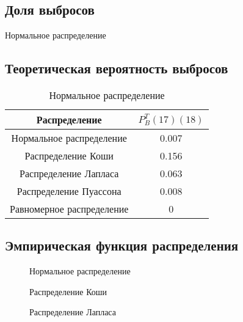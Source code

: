 \subsection{Доля выбросов}
	\begin{table}[H]
		\label{tabular:timesandtenses}
		\begin{center}
			
		\end{center}
		\caption{Нормальное распределение}
	\end{table}

\subsection{Теоретическая вероятность выбросов}
	\begin{table}[H]
		\label{tabular:timesandtenses}
		\begin{center}
			\begin{tabular}{| c | c |} \hline Распределение & $P_B^T (17) (18)$ \\ \hline
				 Нормальное распределение & 0.007 \\ \hline 
				 Распределение Коши & 0.156 \\ \hline 
				 Распределение Лапласа& 0.063 \\ \hline 
				 Распределение Пуассона & 0.008 \\ \hline 
				 Равномерное распределение & 0 \\ \hline 
			 \end{tabular}
		\end{center}
		\caption{Нормальное распределение}
	\end{table}

\subsection{Эмпирическая функция распределения}
	\begin{figure}[H]
		\caption{Нормальное распределение}
		\label{ris:image}
	\end{figure}

	\begin{figure}[H]
		\caption{Распределение Коши}
		\label{ris:image}
	\end{figure}

	\begin{figure}[H]
		\caption{Распределение Лапласа}
		\label{ris:image}
	\end{figure}

